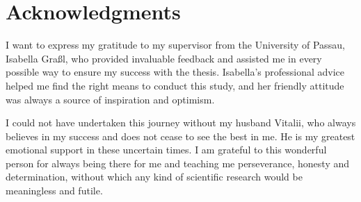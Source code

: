 \chapter*{Acknowledgments}

I want to express my gratitude to my supervisor from the University of Passau, Isabella Graßl, who provided invaluable feedback and assisted me in every possible way to ensure my success with the thesis. Isabella's professional advice helped me find the right means to conduct this study, and her friendly attitude was always a source of inspiration and optimism.

I could not have undertaken this journey without my husband Vitalii, who always believes in my success and does not cease to see the best in me. He is my greatest emotional support in these uncertain times. I am grateful to this wonderful person for always being there for me and teaching me perseverance, honesty and determination, without which any kind of scientific research would be meaningless and futile. 
